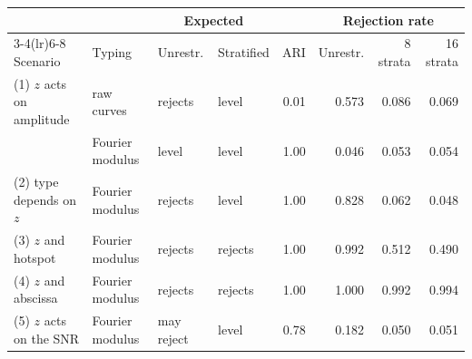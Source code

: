 \begin{tabular}{@{}llllrrrr@{}}
\toprule
 & & \multicolumn{2}{c}{Expected} & & \multicolumn{3}{c}{Rejection rate} \\
\cmidrule(lr){3-4}\cmidrule(lr){6-8}
Scenario & Typing & Unrestr. & Stratified & ARI & Unrestr. & 8 strata & 16 strata \\
\midrule
(1) $z$ acts on amplitude & raw curves & rejects & level & 0.01 & 0.573 & 0.086 & 0.069 \\
 & Fourier modulus & level & level & 1.00 & 0.046 & 0.053 & 0.054 \\
(2) type depends on $z$ & Fourier modulus & rejects & level & 1.00 & 0.828 & 0.062 & 0.048 \\
(3) $z$ and hotspot & Fourier modulus & rejects & rejects & 1.00 & 0.992 & 0.512 & 0.490 \\
(4) $z$ and abscissa & Fourier modulus & rejects & rejects & 1.00 & 1.000 & 0.992 & 0.994 \\
(5) $z$ acts on the SNR & Fourier modulus & may reject & level & 0.78 & 0.182 & 0.050 & 0.051 \\
\bottomrule
\end{tabular}
